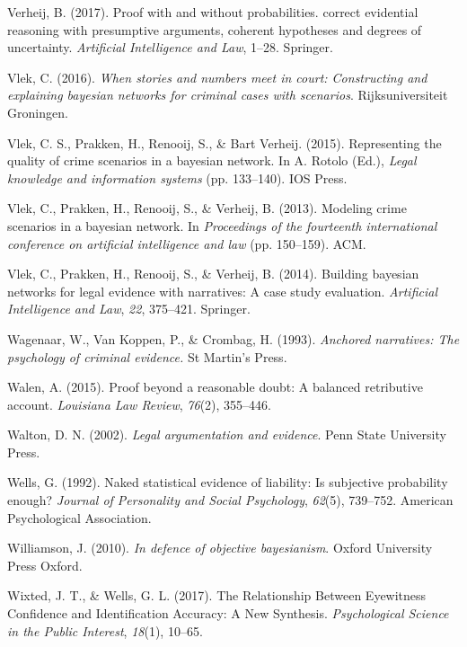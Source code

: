 \documentclass[11pt,dvipsnames,enabledeprecatedfontcommands]{scrartcl}
\begin{document}
\hypertarget{ref-verheijproof2017}{}
Verheij, B. (2017). Proof with and without probabilities. correct
evidential reasoning with presumptive arguments, coherent hypotheses and
degrees of uncertainty. \emph{Artificial Intelligence and Law}, 1--28.
Springer.

\hypertarget{ref-vlek2016stories}{}
Vlek, C. (2016). \emph{When stories and numbers meet in court:
Constructing and explaining bayesian networks for criminal cases with
scenarios}. Rijksuniversiteit Groningen.

\hypertarget{ref-vlek2015}{}
Vlek, C. S., Prakken, H., Renooij, S., \& Bart Verheij. (2015).
Representing the quality of crime scenarios in a bayesian network. In A.
Rotolo (Ed.), \emph{Legal knowledge and information systems} (pp.
133--140). IOS Press.

\hypertarget{ref-vlek2013modeling}{}
Vlek, C., Prakken, H., Renooij, S., \& Verheij, B. (2013). Modeling
crime scenarios in a bayesian network. In \emph{Proceedings of the
fourteenth international conference on artificial intelligence and law}
(pp. 150--159). ACM.

\hypertarget{ref-vlek2014building}{}
Vlek, C., Prakken, H., Renooij, S., \& Verheij, B. (2014). Building
bayesian networks for legal evidence with narratives: A case study
evaluation. \emph{Artificial Intelligence and Law}, \emph{22}, 375--421.
Springer.

\hypertarget{ref-wagenaar1993anchored}{}
Wagenaar, W., Van Koppen, P., \& Crombag, H. (1993). \emph{Anchored
narratives: The psychology of criminal evidence.} St Martin's Press.

\hypertarget{ref-walen2015}{}
Walen, A. (2015). Proof beyond a reasonable doubt: A balanced
retributive account. \emph{Louisiana Law Review}, \emph{76}(2),
355--446.

\hypertarget{ref-Walton2002}{}
Walton, D. N. (2002). \emph{Legal argumentation and evidence}. Penn
State University Press.

\hypertarget{ref-wells1992naked}{}
Wells, G. (1992). Naked statistical evidence of liability: Is subjective
probability enough? \emph{Journal of Personality and Social Psychology},
\emph{62}(5), 739--752. American Psychological Association.

\hypertarget{ref-williamson2010defence}{}
Williamson, J. (2010). \emph{In defence of objective bayesianism}.
Oxford University Press Oxford.

\hypertarget{ref-wixted2017RelationshipEyewitnessConfidence}{}
Wixted, J. T., \& Wells, G. L. (2017). The Relationship Between
Eyewitness Confidence and Identification Accuracy: A New Synthesis.
\emph{Psychological Science in the Public Interest}, \emph{18}(1),
10--65.
\end{document}
